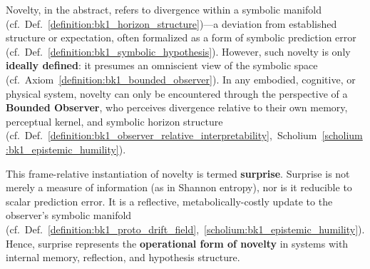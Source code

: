 \begin{tcolorbox}[colback=blue!5!white, colframe=blue!75!black, title=From Novelty to Surprise: The Operational Definition for Observer-Framed Divergence]
\label{definition:bk1_observer_framed_divergence}
Novelty, in the abstract, refers to divergence within a symbolic manifold (cf.~Def.~\ref{definition:bk1_horizon_structure})—a deviation from established structure or expectation, often formalized as a form of symbolic prediction error (cf.~Def.~\ref{definition:bk1_symbolic_hypothesis}). However, such novelty is only \textbf{ideally defined}: it presumes an omniscient view of the symbolic space (cf.~Axiom~\ref{definition:bk1_bounded_observer}). In any embodied, cognitive, or physical system, novelty can only be encountered through the perspective of a \textbf{Bounded Observer}, who perceives divergence relative to their own memory, perceptual kernel, and symbolic horizon structure (cf.~Def.~\ref{definition:bk1_observer_relative_interpretability},~Scholium~\ref{scholium:bk1_epistemic_humility}).

This frame-relative instantiation of novelty is termed \textbf{surprise}. Surprise is not merely a measure of information (as in Shannon entropy), nor is it reducible to scalar prediction error. It is a reflective, metabolically-costly update to the observer’s symbolic manifold (cf.~Def.~\ref{definition:bk1_proto_drift_field},~\ref{scholium:bk1_epistemic_humility}). Hence, surprise represents the \textbf{operational form of novelty} in systems with internal memory, reflection, and hypothesis structure.


\end{tcolorbox}
